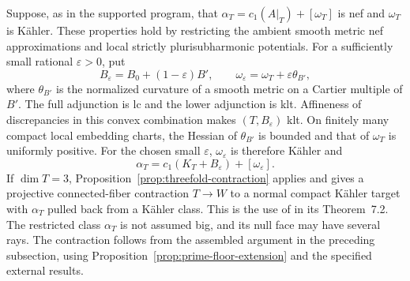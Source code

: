 Suppose, as in the supported program, that
\(\alpha_T=c_1(A|_T)+[\omega_T]\) is nef and \(\omega_T\) is
K\"ahler.  These properties hold by restricting the ambient smooth
metric nef approximations and local strictly plurisubharmonic potentials.
For a sufficiently small rational \(\varepsilon>0\), put
\[
 B_\varepsilon=B_0+(1-\varepsilon)B',\qquad
 \omega_\varepsilon=\omega_T+\varepsilon\theta_{B'},
\]
where \(\theta_{B'}\) is the normalized curvature of a smooth metric
on a Cartier multiple of \(B'\).  The full adjunction is lc and the
lower adjunction is klt.  Affineness of discrepancies in this convex
combination makes \((T,B_\varepsilon)\) klt.  On finitely many compact
local embedding charts, the Hessian of \(\theta_{B'}\) is bounded
and that of \(\omega_T\) is uniformly positive.  For the chosen small
\(\varepsilon\), \(\omega_\varepsilon\) is therefore K\"ahler and
\[
 \alpha_T=c_1(K_T+B_\varepsilon)+[\omega_\varepsilon].
\]
If \(\dim T=3\), Proposition~\ref{prop:threefold-contraction} applies
and gives a projective
connected-fiber contraction \(T\to W\) to a normal compact K\"ahler
target with \(\alpha_T\) pulled back from a K\"ahler class.  This is
the use of \cite[Corollary~5.6]{DasHaconPaun2024} in its Theorem~7.2.
The restricted class \(\alpha_T\) is not assumed big, and its null
face may have several rays.  The contraction follows from the assembled
argument in the preceding subsection, using
Proposition~\ref{prop:prime-floor-extension} and the specified external
results.

